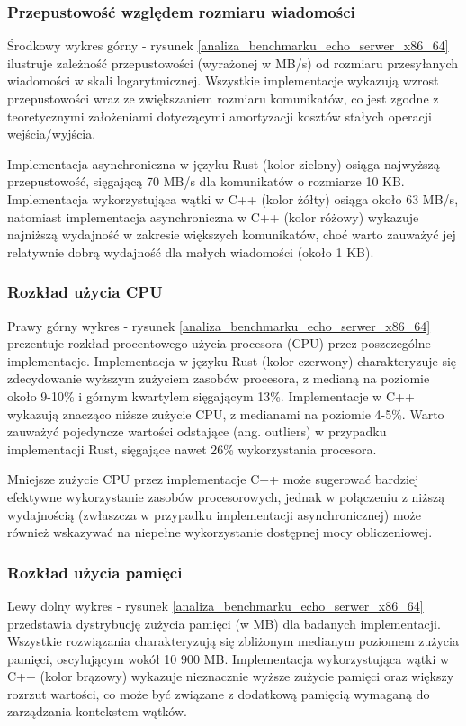 \subsubsection{ Przepustowość względem rozmiaru wiadomości}
Środkowy wykres górny - rysunek \ref{analiza_benchmarku_echo_serwer_x86_64} ilustruje zależność przepustowości (wyrażonej w MB/s) od rozmiaru przesyłanych wiadomości w skali logarytmicznej. Wszystkie implementacje wykazują wzrost przepustowości wraz ze zwiększaniem rozmiaru komunikatów, co jest zgodne z teoretycznymi założeniami dotyczącymi amortyzacji kosztów stałych operacji wejścia/wyjścia.

Implementacja asynchroniczna w języku Rust (kolor zielony) osiąga najwyższą przepustowość, sięgającą 70 MB/s dla komunikatów o rozmiarze 10 KB. Implementacja wykorzystująca wątki w C++ (kolor żółty) osiąga około 63 MB/s, natomiast implementacja asynchroniczna w C++ (kolor różowy) wykazuje najniższą wydajność w zakresie większych komunikatów, choć warto zauważyć jej relatywnie dobrą wydajność dla małych wiadomości (około 1 KB).

\subsubsection{Rozkład użycia CPU}
Prawy górny wykres - rysunek \ref{analiza_benchmarku_echo_serwer_x86_64} prezentuje rozkład procentowego użycia procesora (CPU) przez poszczególne implementacje. Implementacja w języku Rust (kolor czerwony) charakteryzuje się zdecydowanie wyższym zużyciem zasobów procesora, z medianą na poziomie około 9-10\% i górnym kwartylem sięgającym 13\%. Implementacje w C++ wykazują znacząco niższe zużycie CPU, z medianami na poziomie 4-5\%. Warto zauważyć pojedyncze wartości odstające (ang. outliers) w przypadku implementacji Rust, sięgające nawet 26\% wykorzystania procesora.

Mniejsze zużycie CPU przez implementacje C++ może sugerować bardziej efektywne wykorzystanie zasobów procesorowych, jednak w połączeniu z niższą wydajnością (zwłaszcza w przypadku implementacji asynchronicznej) może również wskazywać na niepełne wykorzystanie dostępnej mocy obliczeniowej.

\subsubsection{Rozkład użycia pamięci}
Lewy dolny wykres - rysunek \ref{analiza_benchmarku_echo_serwer_x86_64} przedstawia dystrybucję zużycia pamięci (w MB) dla badanych implementacji. Wszystkie rozwiązania charakteryzują się zbliżonym medianym poziomem zużycia pamięci, oscylującym wokół 10 900 MB. Implementacja wykorzystująca wątki w C++ (kolor brązowy) wykazuje nieznacznie wyższe zużycie pamięci oraz większy rozrzut wartości, co może być związane z dodatkową pamięcią wymaganą do zarządzania kontekstem wątków.

